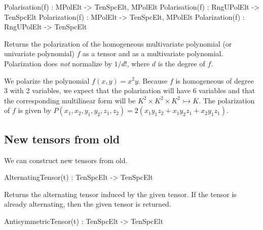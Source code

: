 \begin{intrinsics}
Polarisation(f) : MPolElt -> TenSpcElt, MPolElt
Polarisation(f) : RngUPolElt -> TenSpcElt
Polarization(f) : MPolElt -> TenSpcElt, MPolElt
Polarization(f) : RngUPolElt -> TenSpcElt
\end{intrinsics}

Returns the polarization of the homogeneous multivariate polynomial (or
univariate polynomial) $f$ as a tensor and as a multivariate polynomial.
Polarization does \emph{not} normalize by $1/d!$, where $d$ is the degree of
$f$.  

\begin{example}[TensorPolarization] We polarize the polynomial $f(x,y)=x^2y$.
Because $f$ is homogeneous of degree 3 with 2 variables, we expect that the
polarization will have 6 variables and that the corresponding multilinear form
will be $K^2\times K^2\times K^2\rightarrowtail K$. The polarization of $f$ is
given by $P(x_1,x_2,y_1,y_2,z_1,z_2 ) = 2 (x_1y_1z_2 + x_1y_2z_1 + x_2y_1z_1)$.

\end{example}




\subsection{New tensors from old}
We can construct new tensors from old.

\begin{intrinsics}
AlternatingTensor(t) : TenSpcElt -> TenSpcElt
\end{intrinsics}

Returns the alternating tensor induced by the given tensor. If 
the tensor is already alternating, then the given tensor is returned.

\begin{intrinsics}
AntisymmetricTensor(t) : TenSpcElt -> TenSpcElt
\end{intrinsics}

